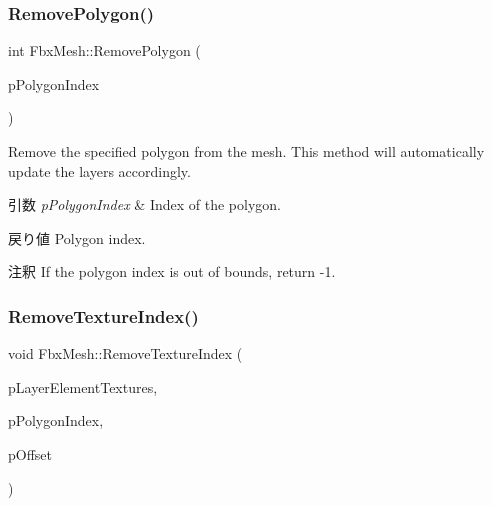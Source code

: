 \subsubsection{\texorpdfstring{Remove\+Polygon()}{RemovePolygon()}}
{\footnotesize\ttfamily int Fbx\+Mesh\+::\+Remove\+Polygon (\begin{DoxyParamCaption}\item[{int}]{p\+Polygon\+Index }\end{DoxyParamCaption})}

Remove the specified polygon from the mesh. This method will automatically update the layers accordingly. 
\begin{DoxyParams}{引数}
{\em p\+Polygon\+Index} & Index of the polygon. \\
\hline
\end{DoxyParams}
\begin{DoxyReturn}{戻り値}
Polygon index. 
\end{DoxyReturn}
\begin{DoxyRemark}{注釈}
If the polygon index is out of bounds, return -\/1. 
\end{DoxyRemark}
\mbox{\label{class_fbx_mesh_a7ae53a8f960212268fbfa5d5a63333ee}} 
\subsubsection{\texorpdfstring{Remove\+Texture\+Index()}{RemoveTextureIndex()}}
{\footnotesize\ttfamily void Fbx\+Mesh\+::\+Remove\+Texture\+Index (\begin{DoxyParamCaption}\item[{\hyperlink{class_fbx_layer_element_texture}{Fbx\+Layer\+Element\+Texture} $\ast$}]{p\+Layer\+Element\+Textures,  }\item[{int}]{p\+Polygon\+Index,  }\item[{int}]{p\+Offset }\end{DoxyParamCaption})\hspace{0.3cm}{\ttfamily [protected]}}

\mbox{\label{class_fbx_mesh_addc0a339c2d452b4a1d8d6a465aa9c62}} 
